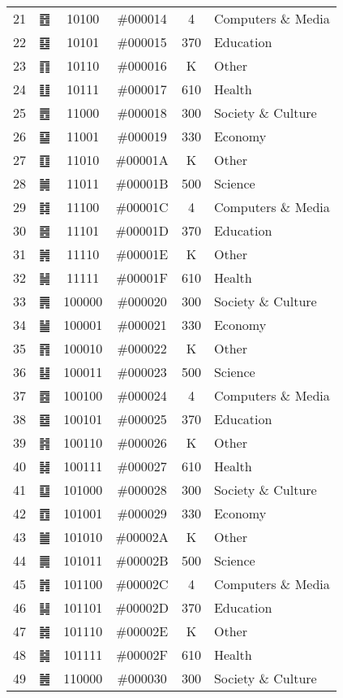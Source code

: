 \documentclass{article}
\begin{document}
\begin{longtable}{|r|c|c|c|c|l|}
21 & ䷔ & 10100   & \#000014 & 4   & Computers \& Media \\
22 & ䷕ & 10101   & \#000015 & 370 & Education \\
23 & ䷖ & 10110   & \#000016 & K   & Other \\
24 & ䷗ & 10111   & \#000017 & 610 & Health \\
25 & ䷘ & 11000   & \#000018 & 300 & Society \& Culture \\
26 & ䷙ & 11001   & \#000019 & 330 & Economy \\
27 & ䷚ & 11010   & \#00001A & K   & Other \\
28 & ䷛ & 11011   & \#00001B & 500 & Science \\
29 & ䷜ & 11100   & \#00001C & 4   & Computers \& Media \\
30 & ䷝ & 11101   & \#00001D & 370 & Education \\
31 & ䷞ & 11110   & \#00001E & K   & Other \\
32 & ䷟ & 11111   & \#00001F & 610 & Health \\
33 & ䷠ & 100000  & \#000020 & 300 & Society \& Culture \\
34 & ䷡ & 100001  & \#000021 & 330 & Economy \\
35 & ䷢ & 100010  & \#000022 & K   & Other \\
36 & ䷣ & 100011  & \#000023 & 500 & Science \\
37 & ䷤ & 100100  & \#000024 & 4   & Computers \& Media \\
38 & ䷥ & 100101  & \#000025 & 370 & Education \\
39 & ䷦ & 100110  & \#000026 & K   & Other \\
40 & ䷧ & 100111  & \#000027 & 610 & Health \\
41 & ䷨ & 101000  & \#000028 & 300 & Society \& Culture \\
42 & ䷩ & 101001  & \#000029 & 330 & Economy \\
43 & ䷪ & 101010  & \#00002A & K   & Other \\
44 & ䷫ & 101011  & \#00002B & 500 & Science \\
45 & ䷬ & 101100  & \#00002C & 4   & Computers \& Media \\
46 & ䷭ & 101101  & \#00002D & 370 & Education \\
47 & ䷮ & 101110  & \#00002E & K   & Other \\
48 & ䷯ & 101111  & \#00002F & 610 & Health \\
49 & ䷰ & 110000  & \#000030 & 300 & Society \& Culture \\

\end{longtable}
\end{document}
